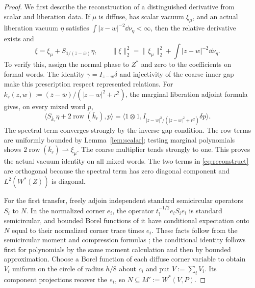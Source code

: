 \begin{proof}
We first describe the reconstruction of a distinguished derivative from scalar and liberation data.
If $\mu$ is diffuse, has scalar vacuum $\xi_\mu$, and an actual liberation vacuum $\eta$ satisfies $\int|z-w|^{-2}\dd\nu_\eta<\infty$, then the relative derivative exists and
\begin{equation}\label{eq:reconstruct}
 \xi=\xi_\mu+S_{1/(\bar z-\bar w)}\eta,\qquad
 \|\xi\|_2^2=\|\xi_\mu\|_2^2+\int|z-w|^{-2}\dd\nu_\eta.
\end{equation}
To verify this, assign the normal phase to $Z^*$ and zero to the coefficients on formal words.
The identity $\gamma=I_{z-w}\delta$ and injectivity of the coarse inner gap make this prescription respect represented relations.
For $k_r(z,w):=(\bar z-\bar w)/(|z-w|^2+r^2)$, the marginal liberation adjoint formula gives, on every mixed word $p$,
\[
 \langle S_{\bar k_r}\eta+2\operatorname{row}(\bar k_r),p\rangle
 =\langle1\otimes1,I_{|z-w|^2/(|z-w|^2+r^2)}\delta p\rangle.
\]
The spectral term converges strongly by the inverse-gap condition.
The row terms are uniformly bounded by Lemma~\ref{lem:scalar}; testing marginal polynomials shows $2\operatorname{row}(\bar k_r)\rightharpoonup\xi_\mu$.
The coarse multiplier tends strongly to one.
This proves the actual vacuum identity on all mixed words.
The two terms in \eqref{eq:reconstruct} are orthogonal because the spectral term has zero diagonal component and $L^2(W^*(Z))$ is diagonal.

For the first transfer, freely adjoin independent standard semicircular operators $S_i$ to $N$.
In the normalized corner $e_i$, the operator $t_i^{-1/2}e_iS_ie_i$ is standard semicircular, and bounded Borel functions of it have conditional expectation onto $N$ equal to their normalized corner trace times $e_i$.
These facts follow from the semicircular moment and compression formulas \cite{NS06}; the conditional identity follows first for polynomials by the same moment calculation and then by bounded approximation.
Choose a Borel function of each diffuse corner variable to obtain $V_i$ uniform on the circle of radius $h/8$ about $c_i$ and put $V:=\sum_iV_i$.
Its component projections recover the $e_i$, so $N\subseteq M':=W^*(V,P)$.


\end{proof}
